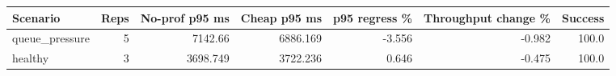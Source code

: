 \begin{tabular}{lrrrrrr}
\hline
Scenario & Reps & No-prof p95 ms & Cheap p95 ms & p95 regress \% & Throughput change \% & Success \\
\hline
queue_pressure & 5 & 7142.66 & 6886.169 & -3.556 & -0.982 & 100.0 \\
healthy & 3 & 3698.749 & 3722.236 & 0.646 & -0.475 & 100.0 \\
\hline
\end{tabular}

